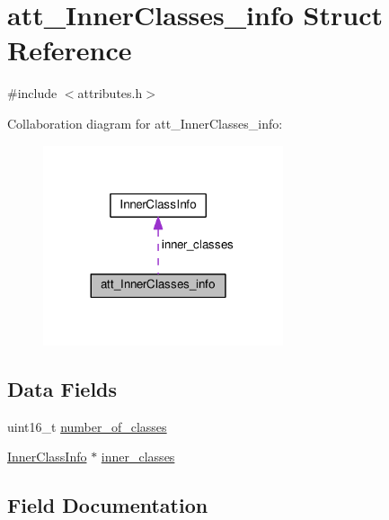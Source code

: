 \hypertarget{structatt__InnerClasses__info}{}\section{att\+\_\+\+Inner\+Classes\+\_\+info Struct Reference}
\label{structatt__InnerClasses__info}


{\ttfamily \#include $<$attributes.\+h$>$}



Collaboration diagram for att\+\_\+\+Inner\+Classes\+\_\+info\+:\nopagebreak
\begin{figure}[H]
\begin{center}
\leavevmode
\includegraphics[width=200pt]{structatt__InnerClasses__info__coll__graph}
\end{center}
\end{figure}
\subsection*{Data Fields}
\begin{DoxyCompactItemize}
\item 
uint16\+\_\+t \hyperlink{structatt__InnerClasses__info_a8bb396e50023f850c80a70e0b736cc77}{number\+\_\+of\+\_\+classes}
\item 
\hyperlink{structInnerClassInfo}{Inner\+Class\+Info} $\ast$ \hyperlink{structatt__InnerClasses__info_a68beb2632952ef867172bfcfa327d256}{inner\+\_\+classes}
\end{DoxyCompactItemize}


\subsection{Field Documentation}
